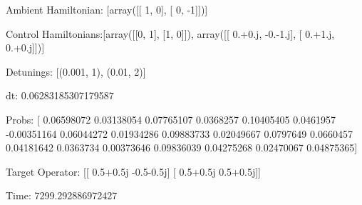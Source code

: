\documentclass{article}
\begin{document}
    

\newpage

Ambient Hamiltonian: [array([[ 1,  0],
       [ 0, -1]])]

Control Hamiltonians:[array([[0, 1],
       [1, 0]]), array([[ 0.+0.j, -0.-1.j],
       [ 0.+1.j,  0.+0.j]])]

Detunings: [(0.001, 1), (0.01, 2)]

 dt: 0.06283185307179587

Probs: [ 0.06598072  0.03138054  0.07765107  0.0368257   0.10405405  0.0461957
 -0.00351164  0.06044272  0.01934286  0.09883733  0.02049667  0.0797649
  0.0660457   0.04181642  0.0363734   0.00373646  0.09836039  0.04275268
  0.02470067  0.04875365]

Target Operator: [[ 0.5+0.5j -0.5-0.5j]
 [ 0.5+0.5j  0.5+0.5j]]

Time: 7299.292886972427
\end{document}
